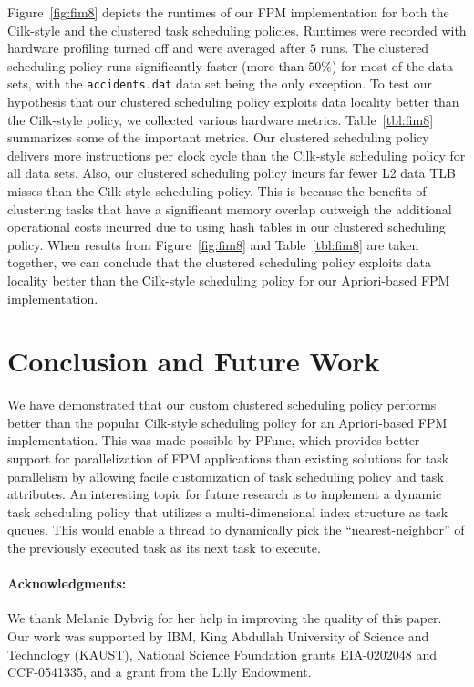 \documentclass{IOS-Book-Article}
\newcommand{\code}[1]{\lstinline[basicstyle=\sffamily]{#1}}
\begin{document}
Figure~\ref{fig:fim8} depicts the runtimes of our FPM implementation for both
the Cilk-style and the clustered task scheduling policies. Runtimes were
recorded with hardware profiling turned off and were averaged after $5$ runs.
The clustered scheduling policy runs significantly faster (more than $50\%$)
for most of the data sets, with the \code{accidents.dat} data set being the
only exception. To test our hypothesis that our clustered scheduling policy
exploits data locality better than the Cilk-style policy, we collected
various hardware metrics.  Table~\ref{tbl:fim8} summarizes some of the
important metrics. Our clustered scheduling policy delivers more instructions
per clock cycle than the Cilk-style scheduling policy for all data sets.
Also, our clustered scheduling policy incurs far fewer L2 data TLB misses
than the Cilk-style scheduling policy. This is because the benefits of
clustering tasks that have a significant memory overlap outweigh the
additional operational costs incurred due to using hash tables in our
clustered scheduling policy.
When results from Figure~\ref{fig:fim8} and Table~\ref{tbl:fim8} are taken
together, we can conclude that the clustered scheduling policy exploits
data locality better than the Cilk-style scheduling policy for our
Apriori-based FPM implementation.

\section{Conclusion and Future Work}
We have demonstrated that our custom clustered scheduling policy performs
better than the popular Cilk-style scheduling policy for an Apriori-based FPM
implementation. This was made possible by PFunc, which provides better support
for parallelization of FPM applications than existing solutions for task
parallelism by allowing facile customization of task scheduling policy and
task attributes. An interesting topic for future research is to implement a
dynamic task scheduling policy that utilizes a multi-dimensional index
structure as task queues.  This would enable a thread to dynamically pick the
``nearest-neighbor'' of the previously executed task as its next task to
execute. 

\paragraph{\textbf{Acknowledgments:}}
We thank Melanie Dybvig for her help in improving the quality of this paper.
Our work was supported by IBM, King Abdullah University of Science and
Technology (KAUST), National Science Foundation grants EIA-0202048 and
CCF-0541335, and a grant from the Lilly Endowment.



\end{document}
